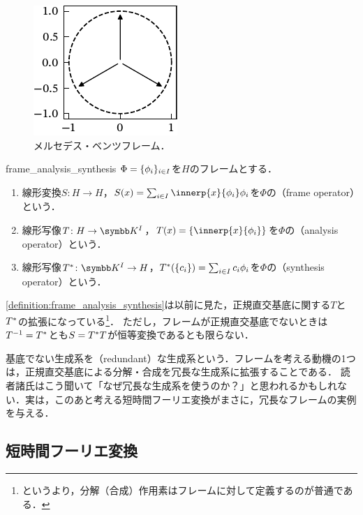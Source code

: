\documentclass[../../main]{subfiles}
\begin{document}
\begin{figure}[htbp]
  \centering
  \includegraphics{figures/mercedes_benz.pdf}
  \caption{メルセデス・ベンツフレーム．}
\end{figure}

\begin{definition}{}{frame_analysis_synthesis}
  \(\Phi=\lbrace\phi_i\rbrace_{i\in I}\)を\(H\)のフレームとする．
  \begin{enumerate}
    \item 線形変換\(S\colon H\to H\)，\(S(x)=\sum_{i\in I}\innerp{x}{\phi_i}\phi_i\)を\(\Phi\)の（frame operator）という．
    \item 線形写像\(T\colon H\to\mapset{I}{\numset{K}}\)，\(T(x)=\seq{\innerp{x}{\phi_i}}\)を\(\Phi\)の（analysis operator）という．
    \item 線形写像\(\synth{T}\colon\mapset{I}{\numset{K}}\to H\)，\(T^{\mathord{\ast}}(\lbrace c_i\rbrace)=\sum_{i\in I}c_i\phi_i\)を\(\Phi\)の（synthesis operator）という．
  \end{enumerate}
\end{definition}

\cref{definition:frame_analysis_synthesis}は以前に見た，正規直交基底に関する\(T\)と\(T^{\mathord{\ast}}\)の拡張になっている\footnote{というより，分解（合成）作用素はフレームに対して定義するのが普通である．}．
ただし，フレームが正規直交基底でないときは\(T^{-1}=T^{\mathord{\ast}}\)とも\(S=T^{\mathord{\ast}}T\)が恒等変換であるとも限らない．

基底でない生成系を（redundant）な生成系という．フレームを考える動機の1つは，正規直交基底による分解・合成を冗長な生成系に拡張することである．
読者諸氏はこう聞いて「なぜ冗長な生成系を使うのか？」と思われるかもしれない．実は，このあと考える短時間フーリエ変換がまさに，冗長なフレームの実例を与える．

\subsection{短時間フーリエ変換}
\end{document}
